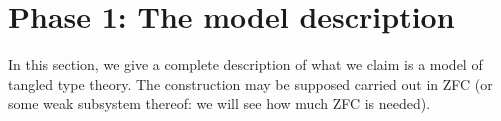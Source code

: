 









\newcommand{\dom}{\mathrm{dom}}
\newcommand{\rge}{\mathrm{rge}}
\newcommand{\Pretangle}{\mathrm{Pretangle}}
\newcommand{\Sym}{\mathrm{Sym}}
\newcommand{\Str}{\mathrm{Str}}
\newcommand{\All}{\mathrm{All}}
\newcommand{\Cond}{\mathrm{Cond}}

\chapter{Phase 1: The model description}

In this section, we give a complete description of what we claim is a model of tangled type theory.  The construction may be supposed carried out in ZFC (or some weak subsystem thereof:  we will see how much ZFC is needed).

